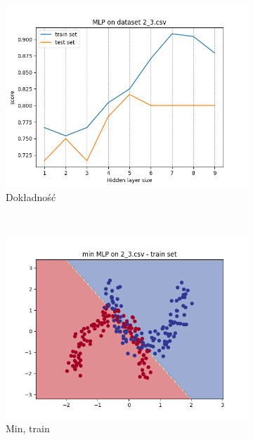 \documentclass[12pt]{article}
\newcommand*{\subfigwidth}{0.24\textwidth}
\begin{document}
\begin{figure}[H]\centering
    \begin{subfigure}[t]{\subfigwidth}
        \includegraphics[width=\linewidth]{img/exp_2/mlp/2_3/accuracy.png}
        \caption{Dokładność}
    \end{subfigure}
    \\
    \begin{subfigure}[t]{\subfigwidth}
        \includegraphics[width=\linewidth]{img/exp_2/mlp/2_3/min/train_boundary.png}
        \caption{Min, train}
    \end{subfigure}
    \hfill
    \begin{subfigure}[t]{\subfigwidth}

\end{subfigure}
\end{figure}
\end{document}

